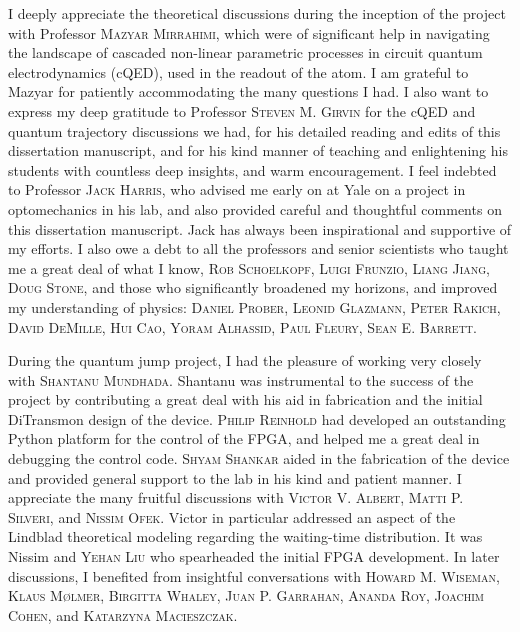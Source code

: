 I deeply appreciate the theoretical discussions during the inception of the project with Professor \textsc{Mazyar Mirrahimi}, which were of significant help in navigating the landscape of cascaded non-linear parametric processes in circuit quantum electrodynamics (cQED), used in the readout of the atom.  I am grateful to Mazyar for patiently accommodating the many questions I had. I also want to express my deep gratitude to Professor \textsc{Steven M. Girvin} for the cQED and quantum trajectory discussions we had, for his detailed reading and edits of this dissertation manuscript, and for his kind manner of teaching and enlightening his students with countless deep insights, and warm encouragement. I feel indebted to Professor \textsc{Jack Harris}, who advised me early on at Yale on a project in optomechanics in his lab, and also provided careful and thoughtful comments on this dissertation manuscript. Jack has always been inspirational and supportive of my efforts. I also owe a debt to all the professors and senior scientists who taught me a great deal of what I know, \textsc{Rob Schoelkopf, Luigi Frunzio, Liang Jiang, Doug Stone}, and those who significantly broadened my horizons, and improved my understanding of physics: \textsc{Daniel Prober, Leonid Glazmann, Peter Rakich, David DeMille, Hui Cao, Yoram Alhassid, Paul Fleury, Sean E. Barrett}.

During the quantum jump project, I had the pleasure of working very closely with \textsc{Shantanu Mundhada}. Shantanu was instrumental to the success of the project by contributing a great deal with his aid in fabrication and the initial DiTransmon design of the device. \textsc{Philip Reinhold} had developed an outstanding Python platform for the control of the FPGA, and helped me a great deal in debugging the control code. \textsc{Shyam Shankar} aided in the fabrication of the device and provided general support to the lab in his kind and patient manner. I appreciate the many fruitful discussions with \textsc{Victor V. Albert, Matti P. Silveri,} and \textsc{Nissim Ofek}. Victor in particular addressed an aspect of the Lindblad theoretical modeling regarding the waiting-time distribution. It was Nissim and \textsc{Yehan Liu} who spearheaded the initial FPGA development.  In later discussions, I benefited from insightful conversations with \textsc{Howard M. Wiseman, Klaus  Mølmer, Birgitta Whaley, Juan P. Garrahan, Ananda Roy, Joachim Cohen,} and \textsc{Katarzyna Macieszczak.} 

